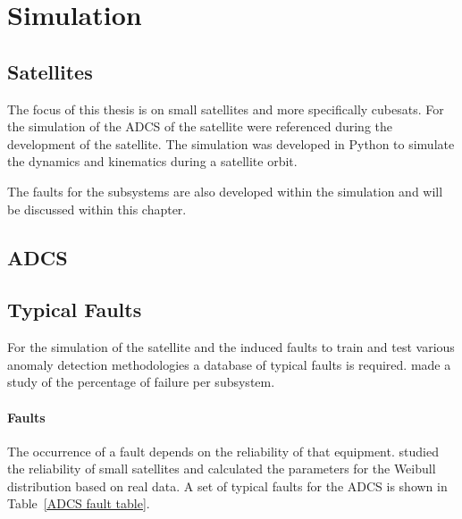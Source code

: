 \chapter{Simulation}
\vspace{-2em}
\minitoc
\section{Satellites}
The focus of this thesis is on small satellites and more specifically cubesats. For the simulation of the ADCS of the satellite \cite{auret2012design, JansevanVuuren2015, Jordaan2016} were referenced during the development of the satellite. The simulation was developed in Python to simulate the dynamics and kinematics during a satellite orbit.

The faults for the subsystems are also developed within the simulation and will be discussed within this chapter.

\section{ADCS}

\section{Typical Faults}
For the simulation of the satellite and the induced faults to train and test various anomaly detection methodologies a database of typical faults is required. \textcite{tafazoli2009study} made a study of the percentage of failure per subsystem. 

\subsubsection{Faults}
The occurrence of a fault depends on the reliability of that equipment. \textcite{Guo2014} studied the reliability of small satellites and calculated the parameters for the Weibull distribution based on real data. A set of typical faults for the ADCS is shown in Table~\ref{ADCS fault table}. 

